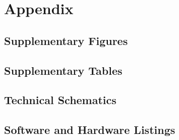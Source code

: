 \chapter{Appendix}

\section{Supplementary Figures}

\section{Supplementary Tables}

\section{Technical Schematics}

\section{Software and Hardware Listings}
